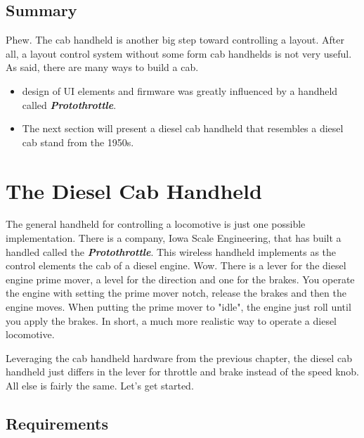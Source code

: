 \subsection{Summary}

Phew. The cab handheld is another big step toward controlling a layout. After all, a layout control system without some form cab handhelds is not very useful. As said, there are many ways to build a cab.

\begin{itemize}
\item design of UI elements and firmware was greatly influenced by a handheld called \textbf{\textit{Protothrottle}}.
\item The next section will present a diesel cab handheld that resembles a diesel cab stand from the 1950s.
\end{itemize}

\section{The Diesel Cab Handheld}

The general handheld for controlling a locomotive is just one possible implementation. There is a company, Iowa Scale Engineering, that has built a handled called the \textbf{\textit{Protothrottle}}. This wireless handheld implements as the control elements the cab of a diesel engine. Wow. There is a lever for the diesel engine prime mover, a level for the direction and one for the brakes. You operate the engine with setting the prime mover notch, release the brakes and then the engine moves. When putting the prime mover to "idle", the engine just roll until you apply the brakes. In short, a much more realistic way to operate a diesel locomotive.


Leveraging the cab handheld hardware from the previous chapter, the diesel cab handheld just differs in the lever for throttle and brake instead of the speed knob. All else is fairly the same. Let's get started.

\subsection{Requirements}

